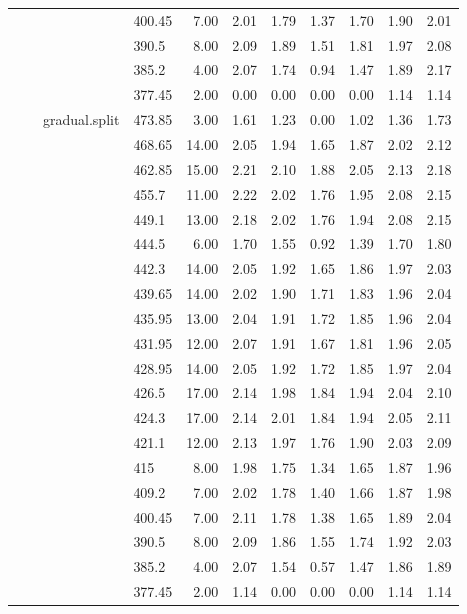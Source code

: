 \begin{longtable}{llllrrrrrrr}
   &  &  & 400.45 & 7.00 & 2.01 & 1.79 & 1.37 & 1.70 & 1.90 & 2.01 \\ 
   &  &  & 390.5 & 8.00 & 2.09 & 1.89 & 1.51 & 1.81 & 1.97 & 2.08 \\ 
   &  &  & 385.2 & 4.00 & 2.07 & 1.74 & 0.94 & 1.47 & 1.89 & 2.17 \\ 
   &  &  & 377.45 & 2.00 & 0.00 & 0.00 & 0.00 & 0.00 & 1.14 & 1.14 \\ 
   &  & gradual.split & 473.85 & 3.00 & 1.61 & 1.23 & 0.00 & 1.02 & 1.36 & 1.73 \\ 
   &  &  & 468.65 & 14.00 & 2.05 & 1.94 & 1.65 & 1.87 & 2.02 & 2.12 \\ 
   &  &  & 462.85 & 15.00 & 2.21 & 2.10 & 1.88 & 2.05 & 2.13 & 2.18 \\ 
   &  &  & 455.7 & 11.00 & 2.22 & 2.02 & 1.76 & 1.95 & 2.08 & 2.15 \\ 
   &  &  & 449.1 & 13.00 & 2.18 & 2.02 & 1.76 & 1.94 & 2.08 & 2.15 \\ 
   &  &  & 444.5 & 6.00 & 1.70 & 1.55 & 0.92 & 1.39 & 1.70 & 1.80 \\ 
   &  &  & 442.3 & 14.00 & 2.05 & 1.92 & 1.65 & 1.86 & 1.97 & 2.03 \\ 
   &  &  & 439.65 & 14.00 & 2.02 & 1.90 & 1.71 & 1.83 & 1.96 & 2.04 \\ 
   &  &  & 435.95 & 13.00 & 2.04 & 1.91 & 1.72 & 1.85 & 1.96 & 2.04 \\ 
   &  &  & 431.95 & 12.00 & 2.07 & 1.91 & 1.67 & 1.81 & 1.96 & 2.05 \\ 
   &  &  & 428.95 & 14.00 & 2.05 & 1.92 & 1.72 & 1.85 & 1.97 & 2.04 \\ 
   &  &  & 426.5 & 17.00 & 2.14 & 1.98 & 1.84 & 1.94 & 2.04 & 2.10 \\ 
   &  &  & 424.3 & 17.00 & 2.14 & 2.01 & 1.84 & 1.94 & 2.05 & 2.11 \\ 
   &  &  & 421.1 & 12.00 & 2.13 & 1.97 & 1.76 & 1.90 & 2.03 & 2.09 \\ 
   &  &  & 415 & 8.00 & 1.98 & 1.75 & 1.34 & 1.65 & 1.87 & 1.96 \\ 
   &  &  & 409.2 & 7.00 & 2.02 & 1.78 & 1.40 & 1.66 & 1.87 & 1.98 \\ 
   &  &  & 400.45 & 7.00 & 2.11 & 1.78 & 1.38 & 1.65 & 1.89 & 2.04 \\ 
   &  &  & 390.5 & 8.00 & 2.09 & 1.86 & 1.55 & 1.74 & 1.92 & 2.03 \\ 
   &  &  & 385.2 & 4.00 & 2.07 & 1.54 & 0.57 & 1.47 & 1.86 & 1.89 \\ 
   &  &  & 377.45 & 2.00 & 1.14 & 0.00 & 0.00 & 0.00 & 1.14 & 1.14 \\ 

\end{longtable}
